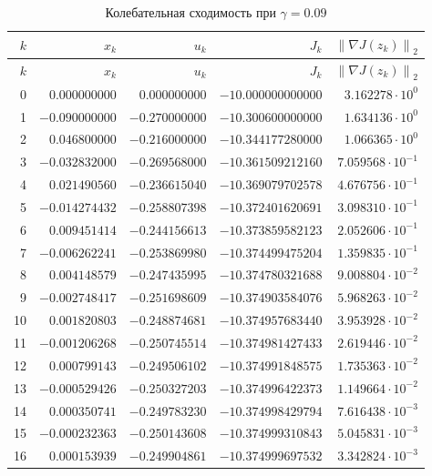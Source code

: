 \documentclass[12pt,a4paper]{article}
\newcommand{\norm}[1]{\left\lVert#1\right\rVert_2}
\begin{document}
\begin{center}\footnotesize\setlength{\tabcolsep}{4pt}
\begin{longtable}{r|r|r|r|r}
\caption{Колебательная сходимость при $\gamma=0.09$}\\
\hline $k$&$x_k$&$u_k$&$J_k$&$\norm{\nabla J(z_k)}$\\\hline
\endfirsthead
\hline $k$&$x_k$&$u_k$&$J_k$&$\norm{\nabla J(z_k)}$\\\hline
\endhead
0 & $0.000000000$ & $0.000000000$ & $-10.000000000000$ & $3.162278\cdot10^{0}$ \\
1 & $-0.090000000$ & $-0.270000000$ & $-10.300600000000$ & $1.634136\cdot10^{0}$ \\
2 & $0.046800000$ & $-0.216000000$ & $-10.344177280000$ & $1.066365\cdot10^{0}$ \\
3 & $-0.032832000$ & $-0.269568000$ & $-10.361509212160$ & $7.059568\cdot10^{-1}$ \\
4 & $0.021490560$ & $-0.236615040$ & $-10.369079702578$ & $4.676756\cdot10^{-1}$ \\
5 & $-0.014274432$ & $-0.258807398$ & $-10.372401620691$ & $3.098310\cdot10^{-1}$ \\
6 & $0.009451414$ & $-0.244156613$ & $-10.373859582123$ & $2.052606\cdot10^{-1}$ \\
7 & $-0.006262241$ & $-0.253869980$ & $-10.374499475204$ & $1.359835\cdot10^{-1}$ \\
8 & $0.004148579$ & $-0.247435995$ & $-10.374780321688$ & $9.008804\cdot10^{-2}$ \\
9 & $-0.002748417$ & $-0.251698609$ & $-10.374903584076$ & $5.968263\cdot10^{-2}$ \\
10 & $0.001820803$ & $-0.248874681$ & $-10.374957683440$ & $3.953928\cdot10^{-2}$ \\
11 & $-0.001206268$ & $-0.250745514$ & $-10.374981427433$ & $2.619446\cdot10^{-2}$ \\
12 & $0.000799143$ & $-0.249506102$ & $-10.374991848575$ & $1.735363\cdot10^{-2}$ \\
13 & $-0.000529426$ & $-0.250327203$ & $-10.374996422373$ & $1.149664\cdot10^{-2}$ \\
14 & $0.000350741$ & $-0.249783230$ & $-10.374998429794$ & $7.616438\cdot10^{-3}$ \\
15 & $-0.000232363$ & $-0.250143608$ & $-10.374999310843$ & $5.045831\cdot10^{-3}$ \\
16 & $0.000153939$ & $-0.249904861$ & $-10.374999697532$ & $3.342824\cdot10^{-3}$ \\

\end{longtable}
\end{center}
\end{document}
